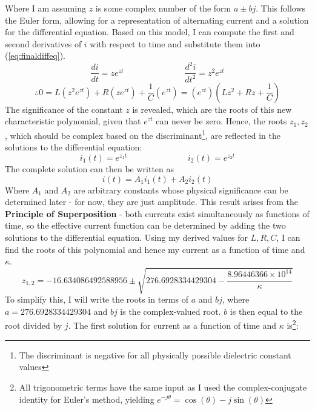 \documentclass[12pt]{article}
\numberwithin{equation}{section}
\begin{document}
\noindent Where I am assuming $z$ is some complex number of the form $a \pm bj$. This follows the Euler form, allowing for a representation of alternating current and a solution for the differential equation. Based on this model, I can compute the first and second derivatives of $i$ with respect to time and substitute them into (\ref{eq:finaldiffeq}).
$$ \frac{di}{dt} = ze^{zt} \hspace{3cm} \frac{d^2i}{dt^2} = z^2e^{zt}$$
$$ \therefore 0 = L(z^2e^{zt}) + R(ze^{zt}) + \frac{1}{C} (e^{zt})= (e^{zt}) \left( Lz^2 + Rz + \frac{1}{C} \right) $$
The significance of the constant $z$ is revealed, which are the roots of this new characteristic polynomial, given that $e^{zt}$ can never be zero. Hence, the roots $z_1, z_2$, which should be complex based on the discriminant\footnote{The discriminant is negative for all physically possible dielectric constant values}, are reflected in the solutions to the differential equation:
\begin{equation}
    i_1(t) = e^{z_1 t} \hspace{3cm} i_2(t) = e^{z_2 t}
\end{equation}
\noindent The complete solution can then be written as 
$$ i(t) = A_1i_1(t) + A_2i_2(t) $$
Where $A_1$ and $A_2$ are arbitrary constants whose physical significance can be determined later - for now, they are just amplitude. This result arises from the \textbf{Principle of Superposition} - both currents exist simultaneously as functions of time, so the effective current function can be determined by adding the two solutions to the differential equation. Using my derived values for $L, R, C$, I can find the roots of this polynomial and hence my current as a function of time and $\kappa$.
\begin{equation}
    z_{1,2} = -16.634086492588956 \pm 
\sqrt{276.6928334429304 - \frac{8.96446366 \times 10^{14}}{\kappa}}
\end{equation}
To simplify this, I will write the roots in terms of $a$ and $bj$, where $a=276.6928334429304$ and $bj$ is the complex-valued root. $b$ is then equal to the root divided by $j$. The first solution for current as a function of time and $\kappa$ is\footnote{All trigonometric terms have the same input as I used the complex-conjugate identity for Euler's method, yielding $e^{-j\theta} = \cos(\theta) - j\sin(\theta)$}:
\end{document}
